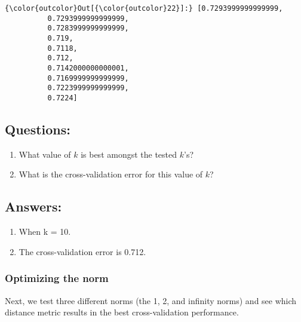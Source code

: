 \documentclass[11pt]{article}
\begin{document}
\begin{Verbatim}[commandchars=\\\{\}]
{\color{outcolor}Out[{\color{outcolor}22}]:} [0.7293999999999999,
          0.7293999999999999,
          0.7283999999999999,
          0.719,
          0.7118,
          0.712,
          0.7142000000000001,
          0.7169999999999999,
          0.7223999999999999,
          0.7224]
\end{Verbatim}
            
    \subsection{Questions:}\label{questions}

\begin{enumerate}
\def\labelenumi{(\arabic{enumi})}
\item
  What value of \(k\) is best amongst the tested \(k\)'s?
\item
  What is the cross-validation error for this value of \(k\)?
\end{enumerate}

    \subsection{Answers:}\label{answers}

\begin{enumerate}
\def\labelenumi{(\arabic{enumi})}
\item
  When k = 10.
\item
  The cross-validation error is 0.712.
\end{enumerate}

    \subsubsection{Optimizing the norm}\label{optimizing-the-norm}

Next, we test three different norms (the 1, 2, and infinity norms) and
see which distance metric results in the best cross-validation
performance.
\end{document}
